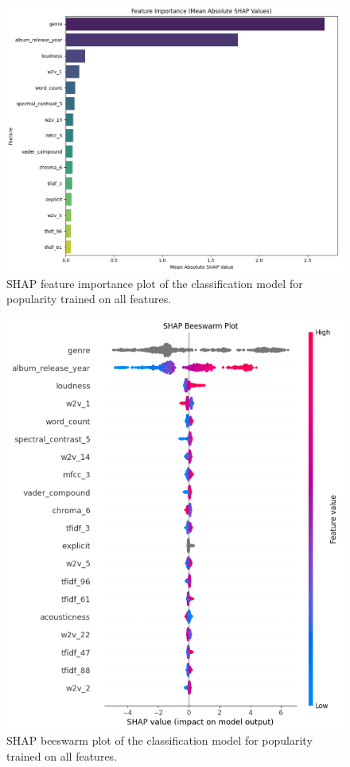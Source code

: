 \begin{center}
\begin{figure}[H]
  \centering
  \includegraphics[width=5in]{img/feature_importance_popularity_clf.png}
  \caption{SHAP feature importance plot of the classification model for popularity trained on all features.}
  \label{Figure:fig_beh}
\end{figure}
\end{center}

\begin{center}
\begin{figure}[H]
  \centering
  \includegraphics[width=5in]{img/beeswarm_popularity_clf.png}
  \caption{SHAP beeswarm plot of the classification model for popularity trained on all features.}
  \label{Figure:fig_beh}
\end{figure}
\end{center}



